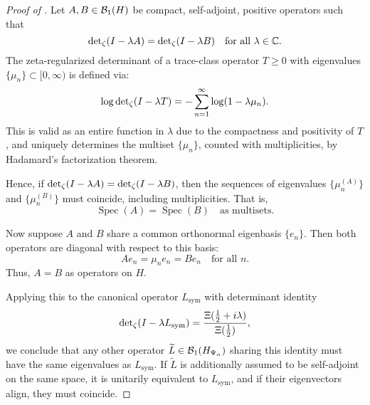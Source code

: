 \begin{proof}[Proof of ]
Let \( A, B \in \mathcal{B}_1(H) \) be compact, self-adjoint, positive operators such that
\[
\det\nolimits_{\zeta}(I - \lambda A) = \det\nolimits_{\zeta}(I - \lambda B) \quad \text{for all } \lambda \in \mathbb{C}.
\]
The zeta-regularized determinant of a trace-class operator \( T \ge 0 \) with eigenvalues \( \{\mu_n\} \subset [0, \infty) \) is defined via:
\[
\log \det\nolimits_{\zeta}(I - \lambda T) = -\sum_{n=1}^\infty \log(1 - \lambda \mu_n).
\]
This is valid as an entire function in \( \lambda \) due to the compactness and positivity of \( T \), and uniquely determines the multiset \( \{\mu_n\} \), counted with multiplicities, by Hadamard's factorization theorem.

Hence, if \( \det\nolimits_{\zeta}(I - \lambda A) = \det\nolimits_{\zeta}(I - \lambda B) \), then the sequences of eigenvalues \( \{\mu_n^{(A)}\} \) and \( \{\mu_n^{(B)}\} \) must coincide, including multiplicities. That is,
\[
\operatorname{Spec}(A) = \operatorname{Spec}(B) \quad \text{as multisets}.
\]

Now suppose \( A \) and \( B \) share a common orthonormal eigenbasis \( \{e_n\} \). Then both operators are diagonal with respect to this basis:
\[
A e_n = \mu_n e_n = B e_n \quad \text{for all } n.
\]
Thus, \( A = B \) as operators on \( H \).

Applying this to the canonical operator \( L_{\mathrm{sym}} \) with determinant identity
\[
\det\nolimits_{\zeta}(I - \lambda L_{\mathrm{sym}}) = \frac{\Xi(\tfrac{1}{2} + i\lambda)}{\Xi(\tfrac{1}{2})},
\]
we conclude that any other operator \( \widetilde{L} \in \mathcal{B}_1(H_{\Psi_\alpha}) \) sharing this identity must have the same eigenvalues as \( L_{\mathrm{sym}} \). If \( \widetilde{L} \) is additionally assumed to be self-adjoint on the same space, it is unitarily equivalent to \( L_{\mathrm{sym}} \), and if their eigenvectors align, they must coincide.
\end{proof}
